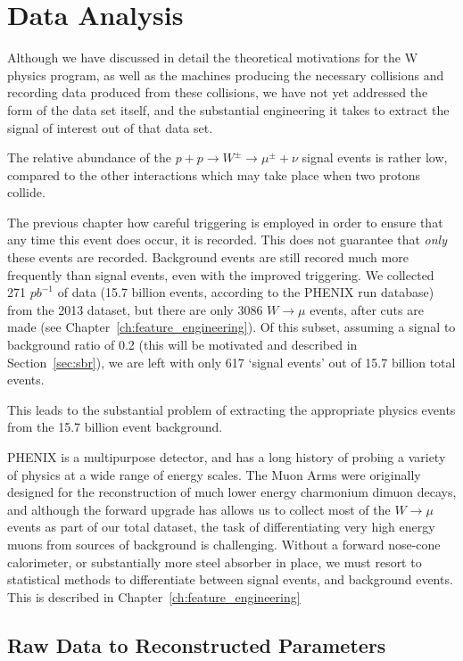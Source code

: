 \chapter{Data Analysis}
\label{ch:data_analysis}
Although we have discussed in detail the theoretical motivations for the W
physics program, as well as the machines producing the necessary collisions and
recording data produced from these collisions, we have not yet addressed the
form of the data set itself, and the substantial engineering it takes to extract
the signal of interest out of that data set.

The relative abundance of the $p + p \rightarrow W^\pm \rightarrow \mu^\pm +
\nu$ signal events is rather low, compared to the other interactions which may
take place when two protons collide. 

The previous chapter how careful triggering is employed in order to ensure that
any time this event does occur, it is recorded. This does not guarantee that
\textit{only} these events are recorded. Background events are still recored
much more frequently than signal events, even with the improved triggering. We
collected 271 $pb^{-1}$ of data (15.7 billion events, according to the PHENIX
run database) from the 2013 dataset, but there are only 3086 $W\rightarrow\mu$
events, after cuts are made (see Chapter~\ref{ch:feature_engineering}).  Of this
subset, assuming a signal to background ratio of 0.2 (this will be motivated and
described in Section~\ref{sec:sbr}), we are left with only 617 `signal events'
out of 15.7 billion total events.

This leads to the substantial problem of extracting the appropriate physics
events from the 15.7 billion event background. 

PHENIX is a multipurpose detector, and has a long history of probing a variety
of physics at a wide range of energy scales. The Muon Arms were originally
designed for the reconstruction of much lower energy charmonium dimuon decays,
and although the forward upgrade has allows us to collect most of the
$W\rightarrow\mu$ events as part of our total dataset, the task of
differentiating very high energy muons from sources of background is
challenging. Without a forward nose-cone calorimeter, or substantially more
steel absorber in place, we must resort to statistical methods to differentiate
between signal events, and background events. This is described in
Chapter~\ref{ch:feature_engineering}

\section{Raw Data to Reconstructed Parameters}
\label{sec:phenix_raw_data}

